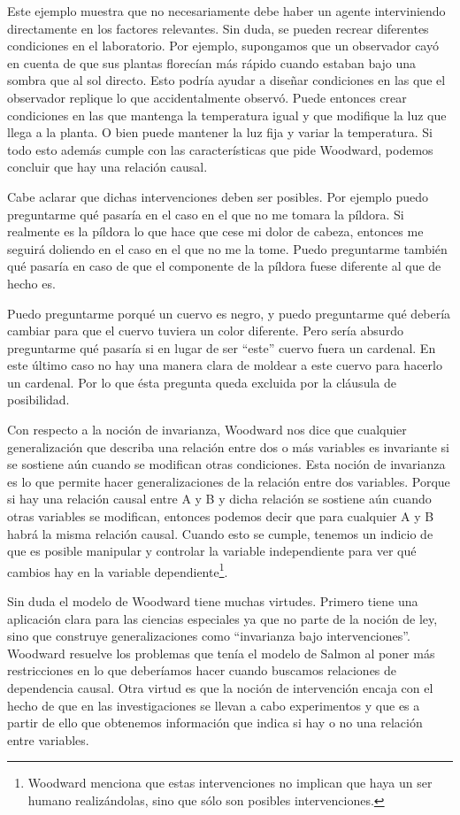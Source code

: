 Este ejemplo muestra que no necesariamente debe haber un agente interviniendo directamente en los factores relevantes. Sin duda, se pueden recrear diferentes condiciones en el laboratorio. Por ejemplo, supongamos que un observador cayó en cuenta de que sus plantas florecían más rápido cuando estaban bajo una sombra que al sol directo. Esto podría ayudar a diseñar condiciones en las que el observador replique lo que accidentalmente observó. Puede entonces crear condiciones en las que mantenga la temperatura igual y que modifique la luz que llega a la planta. O bien puede mantener la luz fija y variar la temperatura. Si todo esto además cumple con las características que pide Woodward, podemos concluir que hay una relación causal.

Cabe aclarar que dichas intervenciones deben ser posibles. Por ejemplo puedo preguntarme qué pasaría en el caso en el que no me tomara la píldora. Si realmente es la píldora lo que hace que cese mi dolor de cabeza, entonces me seguirá doliendo en el caso en el que no me la tome. Puedo preguntarme también qué pasaría en caso de que el componente de la píldora fuese diferente al que de hecho es.

Puedo preguntarme porqué un cuervo es negro, y puedo preguntarme qué debería cambiar para que el cuervo tuviera un color diferente. Pero sería absurdo preguntarme qué pasaría si en lugar de ser ``este'' cuervo fuera un cardenal. En este último caso no hay una manera clara de moldear a este cuervo para hacerlo un cardenal. Por lo que ésta pregunta queda excluida por la cláusula de posibilidad.

Con respecto a la noción de invarianza, Woodward nos dice que cualquier generalización que describa una relación entre dos o más variables es invariante si se sostiene aún cuando se modifican otras condiciones. Esta noción de invarianza es lo que permite hacer generalizaciones de la relación entre dos variables. Porque si hay una relación causal entre A y B y dicha relación se sostiene aún cuando otras variables se modifican, entonces podemos decir que para cualquier A y B habrá la misma relación causal. Cuando esto se cumple, tenemos un indicio de que es posible manipular y controlar la variable independiente para ver qué cambios hay en la variable dependiente\footnote{Woodward menciona que estas intervenciones no implican que haya un ser humano realizándolas, sino que sólo son posibles intervenciones.}\cite{Woodward2000}.

Sin duda el modelo de Woodward tiene muchas virtudes. Primero tiene una aplicación clara para las ciencias especiales ya que no parte de la noción de ley, sino que construye generalizaciones como ``invarianza bajo intervenciones''. Woodward resuelve los problemas que tenía el modelo de Salmon al poner más restricciones en lo que deberíamos hacer cuando buscamos relaciones de dependencia causal. Otra virtud es que la noción de intervención encaja con el hecho de que en las investigaciones se llevan a cabo experimentos y que es a partir de ello que obtenemos información que indica si hay o no una relación entre variables.

